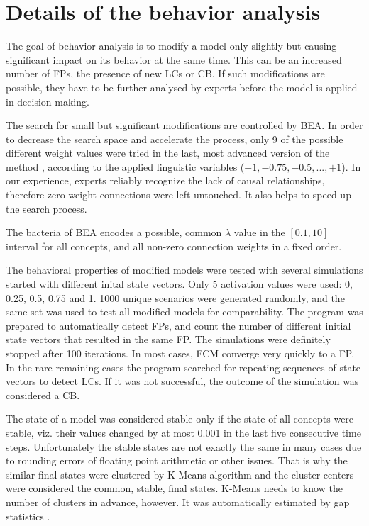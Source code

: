 \documentclass[graybox]{svmult}
\begin{document}
\section{Details of the behavior analysis}
\label{sec:behaviorAnalysis}

The goal of behavior analysis is to modify a model only slightly but 
causing significant impact on its behavior at the same time. This 
can be an increased number of FPs, the presence of new LCs or CB. If 
such modifications are possible, they have to be further analysed by 
experts before the model is applied in decision making.

The search for small but significant modifications are controlled by 
BEA. In order to decrease the search space and accelerate the 
process, only 9 of the possible different weight values were tried 
in the last, most advanced version of the method \cite
{hatwagner2018improved}, according to the applied linguistic 
variables ($-1, -0.75, -0.5, ..., +1$). In our experience, experts 
reliably recognize the lack of causal relationships, therefore zero 
weight connections were left untouched. It also helps to speed up the 
search process.

The bacteria of BEA encodes a possible, common $\lambda$ value in the 
$[0.1, 10]$ interval for all concepts, and all non-zero connection 
weights in a fixed order.

The behavioral properties of modified models were tested with several 
simulations started with different inital state vectors. Only 5 
activation values were used: 0, 0.25, 0.5, 0.75 and 1. 1000 unique 
scenarios were generated randomly, and the same set was used to test 
all modified models for comparability. The program was prepared to 
automatically detect FPs, and count the number of different 
initial state vectors that resulted in the same FP. The simulations 
were definitely stopped after 100 iterations. In most cases, FCM 
converge very quickly to a FP. In the rare remaining cases the program 
searched for repeating sequences of state vectors to detect LCs. If it 
was not successful, the outcome of the simulation was considered a CB. 

The state of a model was considered stable only if the state of all 
concepts were stable, viz. their values changed by at most 0.001 in 
the last five consecutive time steps. Unfortunately the stable 
states are not exactly the same in many cases due to rounding errors 
of floating point arithmetic or other issues. That is why the 
similar final states were clustered by K-Means algorithm \cite
{hartigan1979algorithm} and the cluster centers were considered the 
common, stable, final states. K-Means needs to know the number of 
clusters in advance, however. It was automatically estimated by gap 
statistics \cite{tibshirani2001estimating}.
\end{document}

